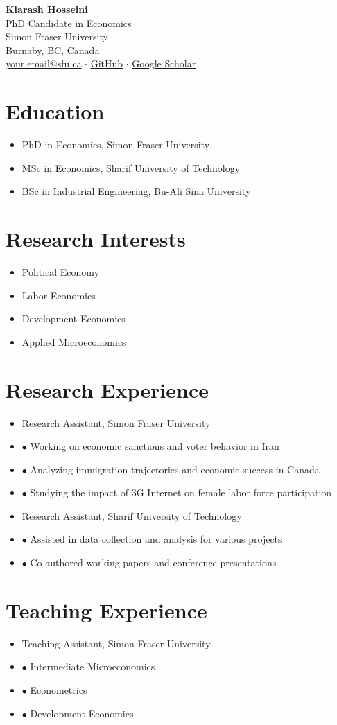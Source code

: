 \documentclass[11pt, a4paper]{article}
\newcommand{\cvsection}[1]{\section*{#1}}
\newcommand{\cvitem}[2]{\item[#1] #2}
\newcommand{\cvsubitem}[1]{\item[] #1}
\begin{document}
\begin{center}
    {\huge\textbf{Kiarash Hosseini}}\\[0.5em]
    {\large PhD Candidate in Economics}\\[0.5em]
    Simon Fraser University\\
    Burnaby, BC, Canada\\[1em]
    \href{mailto:your.email@sfu.ca}{your.email@sfu.ca} $\cdot$ 
    \href{https://github.com/k-hosseini}{GitHub} $\cdot$ 
    \href{https://scholar.google.com/citations?user=YOUR_ID}{Google Scholar}
\end{center}

\cvsection{Education}
\begin{itemize}[leftmargin=*]
    \cvitem{2020--2025 (expected)}{PhD in Economics, Simon Fraser University}
    \cvitem{2016--2018}{MSc in Economics, Sharif University of Technology}
    \cvitem{2011--2015}{BSc in Industrial Engineering, Bu-Ali Sina University}
\end{itemize}

\cvsection{Research Interests}
\begin{itemize}[leftmargin=*]
    \item Political Economy
    \item Labor Economics
    \item Development Economics
    \item Applied Microeconomics
\end{itemize}

\cvsection{Research Experience}
\begin{itemize}[leftmargin=*]
    \cvitem{2020--Present}{Research Assistant, Simon Fraser University}
    \cvsubitem{$\bullet$ Working on economic sanctions and voter behavior in Iran}
    \cvsubitem{$\bullet$ Analyzing immigration trajectories and economic success in Canada}
    \cvsubitem{$\bullet$ Studying the impact of 3G Internet on female labor force participation}
    
    \cvitem{2016--2018}{Research Assistant, Sharif University of Technology}
    \cvsubitem{$\bullet$ Assisted in data collection and analysis for various projects}
    \cvsubitem{$\bullet$ Co-authored working papers and conference presentations}
\end{itemize}

\cvsection{Teaching Experience}
\begin{itemize}[leftmargin=*]
    \cvitem{2022--Present}{Teaching Assistant, Simon Fraser University}
    \cvsubitem{$\bullet$ Intermediate Microeconomics}
    \cvsubitem{$\bullet$ Econometrics}
    \cvsubitem{$\bullet$ Development Economics}
\end{itemize}
\end{document}
